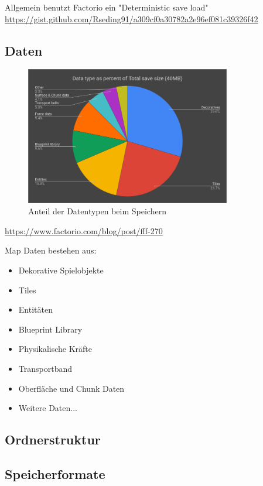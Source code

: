 Allgemein benutzt Factorio ein "Deterministic save load"
\url{https://gist.github.com/Rseding91/a309cf0a30782a2e96ef081c39326f42}


\subsection{Daten}

\begin{figure}[htp]
    \centering
    \includegraphics[width=0.8\textwidth]{images/factorio_save_statistic.png}
    \caption{Anteil der Datentypen beim Speichern}
    \label{fig:factorioSaveStatistic}
\end{figure}
\url{https://www.factorio.com/blog/post/fff-270}

Map Daten bestehen aus:
\begin{itemize}
    \item Dekorative Spielobjekte 
    \item Tiles 
    \item Entitäten
    \item Blueprint Library
    \item Physikalische Kräfte
    \item Transportband
    \item Oberfläche und Chunk Daten
    \item Weitere Daten...
\end{itemize}

\subsection{Ordnerstruktur}

\subsection{Speicherformate}

